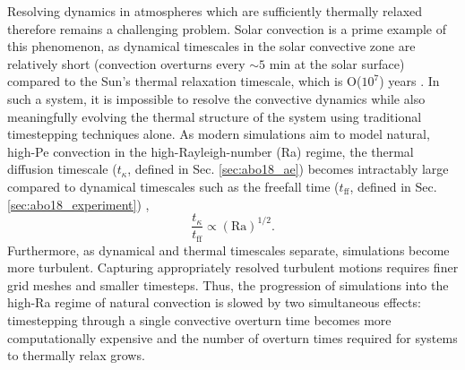 Resolving dynamics in atmospheres which are sufficiently thermally relaxed therefore remains a challenging problem.
Solar convection is a prime example of this phenomenon, as dynamical timescales in the solar convective zone are relatively short (convection overturns every $\sim 5$ min at the solar surface) compared to the Sun's thermal relaxation timescale, which is O($10^7$) years \cite{stix2003}.  
In such a system, it is impossible to resolve the convective dynamics while also meaningfully evolving the thermal structure of the system using traditional timestepping techniques alone.
As modern simulations aim to model natural, high-Pe convection in the high-Rayleigh-number (Ra) regime, the thermal diffusion timescale ($t_{\kappa}$, defined in Sec. \ref{sec:abo18_ae}) becomes intractably large compared to dynamical timescales such as the freefall time ($t_{\text{ff}}$, defined in Sec. \ref{sec:abo18_experiment}) \cite{anders&brown2017}, 
\begin{equation}
\frac{t_{\kappa}}{t_{\text{ff}}} \propto (\text{Ra})^{1/2}.
\end{equation}
Furthermore, as dynamical and thermal timescales separate, simulations become more turbulent. Capturing appropriately resolved turbulent motions requires finer grid meshes and smaller timesteps.
Thus, the progression of simulations into the high-Ra regime of natural convection is slowed by two simultaneous effects: timestepping through a single convective overturn time becomes more computationally expensive and the number of overturn times required for systems to thermally relax grows.

